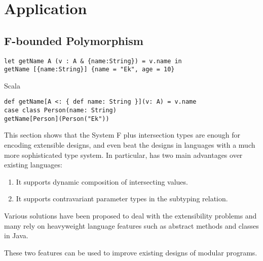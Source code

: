 \section{Application}

\subsection{F-bounded Polymorphism}

\begin{lstlisting}
let getName A (v : A & {name:String}) = v.name in
getName [{name:String}] {name = "Ek", age = 10}
\end{lstlisting}

Scala

\begin{verbatim}
def getName[A <: { def name: String }](v: A) = v.name
case class Person(name: String)
getName[Person](Person("Ek"))
\end{verbatim}




This section shows that the System F plus intersection types are enough for
encoding extensible designs, and even beat the designs in languages with a much
more sophisticated type system. In particular, \name has two main advantages
over existing languages:

\begin{enumerate}
\item It supports dynamic composition of intersecting values.
\item It supports contravariant parameter types in the subtyping relation.
\end{enumerate}

Various solutions have been proposed to deal with the extensibility problems and
many rely on heavyweight language features such as abstract methods and classes
in Java.

These two features can be used to improve existing designs of modular programs.


